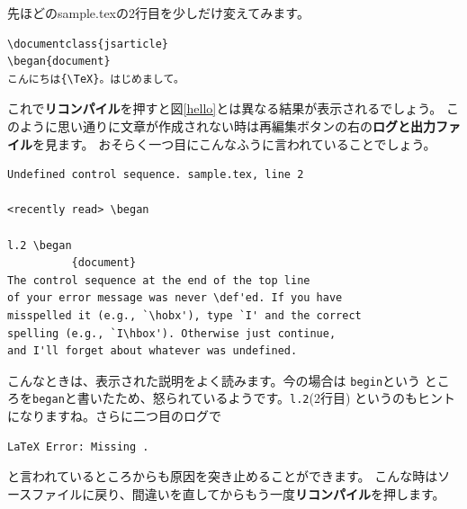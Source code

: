 先ほどのsample.texの2行目を少しだけ変えてみます。
\begin{screen}
\begin{verbatim}
\documentclass{jsarticle}
\began{document}
こんにちは{\TeX}。はじめまして。

\end{verbatim}
\end{screen}
これで\textbf{リコンパイル}を押すと図\ref{hello}とは異なる結果が表示されるでしょう。
このように思い通りに文章が作成されない時は再編集ボタンの右の\textbf{ログと出力ファイル}を見ます。
おそらく一つ目にこんなふうに言われていることでしょう。
\begin{screen}
\begin{verbatim}
Undefined control sequence. sample.tex, line 2

<recently read> \began

l.2 \began
          {document}
The control sequence at the end of the top line
of your error message was never \def'ed. If you have
misspelled it (e.g., `\hobx'), type `I' and the correct
spelling (e.g., `I\hbox'). Otherwise just continue,
and I'll forget about whatever was undefined.
\end{verbatim}
\end{screen}
こんなときは、表示された説明をよく読みます。今の場合は
\verb+begin+という
ところを\verb+began+と書いたため、怒られているようです。\verb+l.2+(2行目)
というのもヒントになりますね。さらに二つ目のログで
\begin{screen}
  \begin{verbatim}
LaTeX Error: Missing .
\end{verbatim}
\end{screen}
と言われているところからも原因を突き止めることができます。
こんな時はソースファイルに戻り、間違いを直してからもう一度\textbf{リコンパイル}を押します。
\pagebreak
